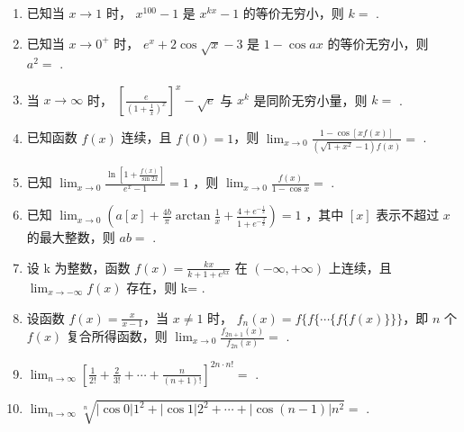 \documentclass[12pt, a4paper]{ctexart}
\begin{document}
\begin{enumerate}[start=29]
    \item 已知当 $ x \to 1 $ 时， $ x^{100} - 1 $ 是 $ x^{kx} - 1 $ 的等价无穷小，则 $ k = $ \underline{\hspace{2cm}}.

    \item 已知当 $ x \to 0^{+} $ 时， $ e^{x} + 2\cos\sqrt{x} - 3 $ 是 $ 1 - \cos ax $ 的等价无穷小，则 $ a^{2} = $ \underline{\hspace{2cm}}.
    
    \item 当 $ x \to \infty $ 时， $ \left[\frac{e}{\left(1+\frac{1}{x}\right)^x}\right]^x - \sqrt{e} $ 与 $ x^k $ 是同阶无穷小量，则 $ k = $ \underline{\hspace{2cm}}.

    \item 已知函数 $ f(x) $ 连续，且 $ f(0)=1 $，则 $ \lim_{x\to0}\frac{1-\cos\left[xf(x)\right]}{\left(\sqrt{1+x^2}-1\right)f(x)}= $ \underline{\hspace{2cm}}.

    \item 已知 $ \lim_{x\to0}\frac{\ln\left[1+\frac{f(x)}{\sin2x}\right]}{e^x-1}=1 $ ，则 $ \lim_{x\to0}\frac{f(x)}{1-\cos x}= $ \underline{\hspace{2cm}}.
    
    \item 已知 $ \lim_{x\to0}\left(a\left[x\right]+\frac{4b}{\pi}\arctan\frac{1}{x}+\frac{4+e^{-\frac{1}{x}}}{1+e^{-\frac{2}{x}}}\right)=1 $ ，其中 $ [x] $ 表示不超过 $ x $ 的最大整数，则 $ ab= $ \underline{\hspace{2cm}}.

    \item 设 k 为整数，函数 $ f(x)=\frac{kx}{k+1+e^{kx}} $ 在 $ (-\infty,+\infty) $ 上连续，且 $ \lim_{x\to-\infty}f(x) $ 存在，则 k= \underline{\hspace{2cm}}.

    \item 设函数 $ f(x) = \frac{x}{x-1} $，当 $ x \neq 1 $ 时， $ f_n(x) = f\{f\{\cdots\{f\{f(x)\}\}\} $，即 $ n $ 个 $ f(x) $ 复合所得函数，则 $ \lim_{x \to 0} \frac{f_{2n+1}(x)}{f_{2n}(x)} = $ \underline{\hspace{2cm}}.
    
    \item $ \lim_{n\to\infty}\left[\frac{1}{2!}+\frac{2}{3!}+\cdots+\frac{n}{\left(n+1\right)!}\right]^{2n\cdot n!}= $ \underline{\hspace{2cm}}.

    \item $ \lim_{n\to\infty}\sqrt[n]{\left|\cos0\right|1^{2}+\left|\cos1\right|2^{2}+\cdots+\left|\cos\left(n-1\right)\right|n^{2}}= $ \underline{\hspace{2cm}}.


\end{enumerate}
\end{document}
